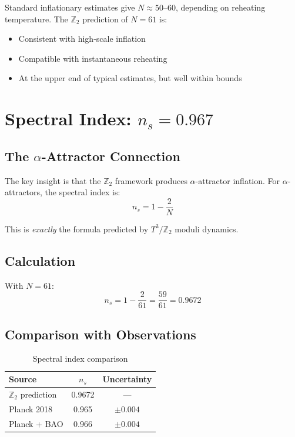 \documentclass[12pt,a4paper]{article}
\begin{document}
Standard inflationary estimates give $N \approx 50$--$60$, depending on reheating temperature. The $\mathbb{Z}_2$ prediction of $N = 61$ is:
\begin{itemize}
    \item Consistent with high-scale inflation
    \item Compatible with instantaneous reheating
    \item At the upper end of typical estimates, but well within bounds
\end{itemize}

\section{Spectral Index: $n_s = 0.967$}

\subsection{The $\alpha$-Attractor Connection}

The key insight is that the $\mathbb{Z}_2$ framework produces $\alpha$-attractor inflation. For $\alpha$-attractors, the spectral index is:
\begin{equation}
n_s = 1 - \frac{2}{N}
\end{equation}

This is \textit{exactly} the formula predicted by $T^3/\mathbb{Z}_2$ moduli dynamics.

\subsection{Calculation}

With $N = 61$:
\begin{equation}
n_s = 1 - \frac{2}{61} = \frac{59}{61} = 0.9672
\end{equation}

\subsection{Comparison with Observations}

\begin{table}[h]
\centering
\begin{tabular}{lcc}
\toprule
Source & $n_s$ & Uncertainty \\
\midrule
$\mathbb{Z}_2$ prediction & 0.9672 & --- \\
Planck 2018 & 0.965 & $\pm 0.004$ \\
Planck + BAO & 0.966 & $\pm 0.004$ \\
\bottomrule
\end{tabular}
\caption{Spectral index comparison}
\end{table}
\end{document}
